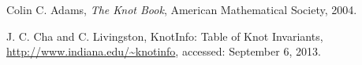 \documentclass[12pt,letterpaper]{article}
\theoremstyle{definition}
\begin{document}
\begin{thebibliography}{9}

	Colin C. Adams,
	\emph{The Knot Book},
	American Mathematical Society,
	2004.

	J. C. Cha and C. Livingston,
	KnotInfo: Table of Knot Invariants,
	\url{http://www.indiana.edu/~knotinfo},
	accessed: September 6, 2013.


\end{thebibliography}
\end{document}
